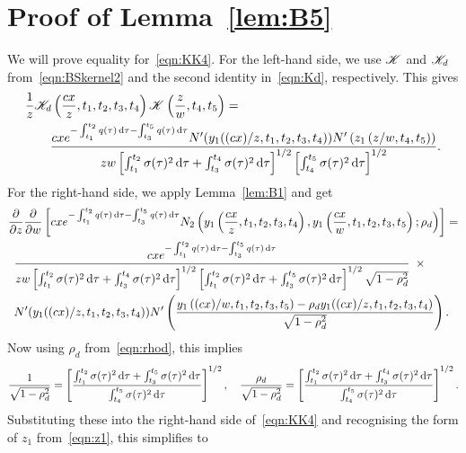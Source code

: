 \section{Proof of Lemma~\ref{lem:B5}}
We will prove equality for~\eqref{eqn:KK4}. For the left-hand side, we use $\mathscr K$ and $\mathscr K_d$ from~\eqref{eqn:BSkernel2} and the second identity in~\eqref{eqn:Kd}, respectively. This gives
	\begin{align*}
		&\frac{1}{z}\mathscr K_d\left( \frac{cx}{z}, t_1,t_2,t_3,t_4 \right)\mathscr K\left( \frac{z}{w}, t_4, t_5 \right) = \\
		&\qquad \frac{cxe^{-\int_{t_1}^{t_2} q(\tau) \,\mathrm d\tau - \int_{t_3}^{t_5} q(\tau) \, \mathrm d\tau}N'(y_1((cx)/z,t_1,t_2,t_3,t_4))N'\left( z_1\left(  z/w, t_4, t_5 \right) \right)}{zw\left[\int_{t_1}^{t_2} \sigma(\tau)^2 \,\mathrm d\tau + \int_{t_3}^{t_4} \sigma(\tau)^2 \, \mathrm d\tau\right]^{1/2}\left[\int_{t_4}^{t_5} \sigma(\tau)^2 \,\mathrm d\tau\right]^{1/2}}.
	\end{align*}
For the right-hand side, we apply Lemma~\ref{lem:B1} and get
	\begin{align*}
		&\frac{\partial}{\partial z}\frac{\partial}{\partial w}\left[ cxe^{-\int_{t_1}^{t_2} q(\tau) \,\mathrm d\tau-\int_{t_3}^{t_5} q(\tau) \, \mathrm d\tau}  N_2\left( y_1\left(\frac{cx}{z}, t_1, t_2, t_3, t_4\right), y_1\left( \frac{cx}{w}, t_1, t_2, t_3, t_5 \right); \rho_d \right)\right] = \\
		& \enskip \frac{cxe^{-\int_{t_1}^{t_2} q(\tau) \,\mathrm d\tau - \int_{t_3}^{t_5} q(\tau) \, \mathrm d\tau}}{zw\left[\int_{t_1}^{t_2} \sigma(\tau)^2 \,\mathrm d\tau + \int_{t_3}^{t_4} \sigma(\tau)^2 \, \mathrm d\tau\right]^{1/2}\left[\int_{t_1}^{t_2} \sigma(\tau)^2 \,\mathrm d\tau + \int_{t_3}^{t_5} \sigma(\tau)^2 \,\mathrm d\tau \right]^{1/2}\sqrt{1-\rho_d^2}} \enskip \times \\
		& \enskip N'(y_1((cx)/z,t_1,t_2,t_3,t_4))N'\left( \frac{y_1\left(  (cx)/w, t_1, t_2, t_3, t_5 \right) - \rho_d y_1( (cx)/z, t_1, t_2, t_3, t_4 )}{\sqrt{1-\rho_d^2}} \right).
	\end{align*}
Now using $\rho_d$ from~\eqref{eqn:rhod}, this implies
	\begin{align*}
		\frac{1}{\sqrt{1-\rho_d^2}} = \left[ \frac{\int_{t_1}^{t_2} \sigma(\tau)^2 \, \mathrm d\tau + \int_{t_3}^{t_5} \sigma(\tau)^2 \, \mathrm d\tau}{\int_{t_4}^{t_5} \sigma(\tau)^2 \, \mathrm d\tau} \right]^{1/2}, \quad \frac{\rho_d}{\sqrt{1-\rho_d^2}} =  \left[ \frac{\int_{t_1}^{t_2} \sigma(\tau)^2 \, \mathrm d\tau + \int_{t_3}^{t_4} \sigma(\tau)^2 \, \mathrm d\tau}{\int_{t_4}^{t_5} \sigma(\tau)^2 \, \mathrm d\tau} \right]^{1/2}.
	\end{align*}
Substituting these into the right-hand side of~\eqref{eqn:KK4} and recognising the form of $z_1$ from~\eqref{eqn:z1}, this simplifies to
